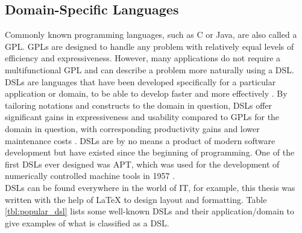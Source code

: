 \subsection{Domain-Specific Languages}
Commonly known programming languages, such as C or Java, are also called a \ac{GPL}. \ac{GPL}s are designed to handle any problem with relatively equal levels of efficiency and expressiveness. However, many applications do not require a multifunctional \ac{GPL} and can describe a problem more naturally using a \ac{DSL}. \ac{DSL}s are languages that have been developed specifically for a particular application or domain, to be able to develop faster and more effectively \parencite[cf.][p. 1]{hudak_domain-specific_1997}. By tailoring notations and constructs to the domain in question, \ac{DSL}s offer significant gains in expressiveness and usability compared to \ac{GPL}s for the domain in question, with corresponding productivity gains and lower maintenance costs \parencite[cf.][p. 317]{mernik_when_2005}. \ac{DSL}s are by no means a product of modern software development but have existed since the beginning of programming. One of the first \ac{DSL}s ever designed was \ac{APT}, which was used for the development of numerically controlled machine tools in 1957 \parencite[cf.][pp. 283-284]{wexelblat_origins_1978}.\\
\ac{DSL}s can be found everywhere in the world of IT, for example, this thesis was written with the help of \LaTeX{} to design layout and formatting. Table \ref{tbl:popular_dsl} lists some well-known \ac{DSL}s and their application/domain to give examples of what is classified as a \ac{DSL}.
